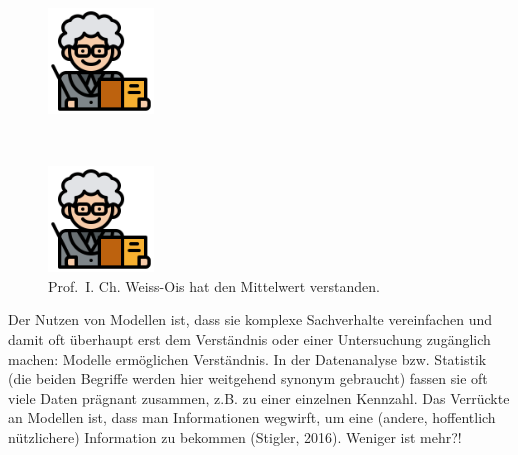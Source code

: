 \documentclass[
  a4paper,
]{scrbook}
\theoremstyle{definition}
\theoremstyle{definition}
\theoremstyle{definition}
\theoremstyle{remark}
\begin{document}
\begin{figure}

\begin{minipage}{0.46\linewidth}

\includegraphics[width=0.25\textwidth,height=\textheight]{img/teacher.png}

\end{minipage}%
%
\begin{minipage}{0.09\linewidth}
~\end{minipage}%
%
\begin{minipage}{0.46\linewidth}

\includegraphics[width=0.25\textwidth,height=\textheight]{img/teacher.png}

\end{minipage}%

\caption{\label{fig-prof}Prof.~I. Ch. Weiss-Ois hat den Mittelwert
verstanden.}

\end{figure}%

Der Nutzen von Modellen ist, dass sie komplexe Sachverhalte vereinfachen
und damit oft überhaupt erst dem Verständnis oder einer Untersuchung
zugänglich machen: Modelle ermöglichen Verständnis. In der Datenanalyse
bzw. Statistik (die beiden Begriffe werden hier weitgehend synonym
gebraucht) fassen sie oft viele Daten prägnant zusammen, z.B. zu einer
einzelnen Kennzahl. Das Verrückte an Modellen ist, dass man
Informationen wegwirft, um eine (andere, hoffentlich nützlichere)
Information zu bekommen (Stigler, 2016). Weniger ist mehr?!
\end{document}
